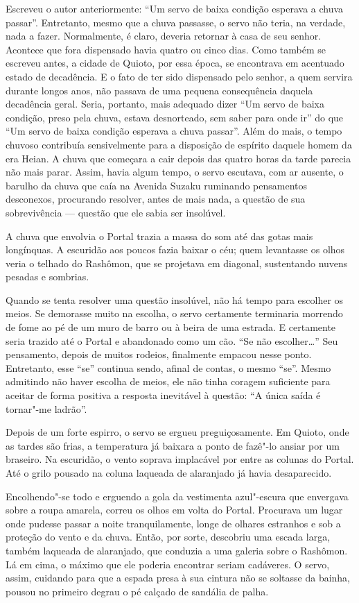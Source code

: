 Escreveu o autor anteriormente: ``Um servo de baixa condição esperava a
chuva passar''. Entretanto, mesmo que a chuva passasse, o servo não
teria, na verdade, nada a fazer. Normalmente, é claro, deveria retornar
à casa de seu senhor. Acontece que fora dispensado havia quatro ou
cinco dias. Como também se escreveu antes, a cidade de Quioto, por essa
época, se encontrava em acentuado estado de decadência. E o fato de ter
sido dispensado pelo senhor, a quem servira durante longos anos, não
passava de uma pequena consequência daquela decadência geral. Seria,
portanto, mais adequado dizer ``Um servo de baixa condição, preso pela
chuva, estava desnorteado, sem saber para onde ir'' do que ``Um servo de
baixa condição esperava a chuva passar''. Além do mais, o tempo chuvoso
contribuía sensivelmente para a disposição de espírito daquele homem da
era Heian. A chuva que começara a cair depois das quatro horas da tarde
parecia não mais parar. Assim, havia algum tempo, o servo escutava, com
ar ausente, o barulho da chuva que caía na Avenida Suzaku ruminando
pensamentos desconexos, procurando resolver, antes de mais nada, a
questão de sua sobrevivência --- questão que ele sabia ser insolúvel.

A chuva que envolvia o Portal trazia a massa do som até das gotas mais
longínquas. A escuridão aos poucos fazia baixar o céu; quem levantasse
os olhos veria o telhado do Rashômon, que se projetava em diagonal,
sustentando nuvens pesadas e sombrias.

Quando se tenta resolver uma questão insolúvel, não há tempo para
escolher os meios. Se demorasse muito na escolha, o servo certamente
terminaria morrendo de fome ao pé de um muro de barro ou à beira de uma
estrada. E certamente seria trazido até o Portal e abandonado como um
cão. ``Se não escolher\ldots{}'' Seu pensamento, depois de muitos rodeios,
finalmente empacou nesse ponto. Entretanto, esse ``se'' continua sendo,
afinal de contas, o mesmo ``se''. Mesmo admitindo não haver escolha de
meios, ele não tinha coragem suficiente para aceitar de forma positiva
a resposta inevitável à questão: ``A única saída é tornar"-me ladrão''.

Depois de um forte espirro, o servo se ergueu preguiçosamente. Em
Quioto, onde as tardes são frias, a temperatura já baixara a ponto de
fazê"-lo ansiar por um braseiro. Na escuridão, o vento soprava
implacável por entre as colunas do Portal. Até o grilo pousado na
coluna laqueada de alaranjado já havia desaparecido.

Encolhendo"-se todo e erguendo a gola da vestimenta azul"-escura que
envergava sobre a roupa amarela, correu os olhos em volta do Portal.
Procurava um lugar onde pudesse passar a noite tranquilamente, longe de
olhares estranhos e sob a proteção do vento e da chuva. Então, por
sorte, descobriu uma escada larga, também laqueada de alaranjado, que
conduzia a uma galeria sobre o Rashômon. Lá em cima, o máximo que ele
poderia encontrar seriam cadáveres. O servo, assim, cuidando para que a
espada presa à sua cintura não se soltasse da bainha, pousou no
primeiro degrau o pé calçado de sandália de palha.

